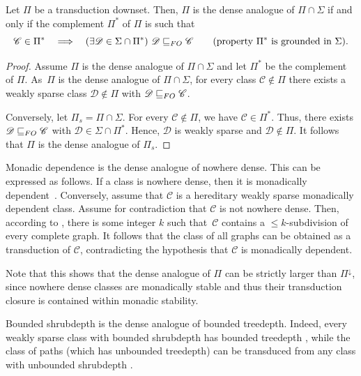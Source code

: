 \documentclass{lmcs}
\newcommand{\Cc}{\mathscr{C}}
\newcommand{\Dd}{\mathscr{D}}
\renewcommand{\FO}{{\rm FO}}
\theoremstyle{definition}
\newcommand{\dset}{downset\xspace}
\begin{document}
\begin{prop}
	Let $\Pi$ be a transduction \dset.
	Then, $\Pi$ is the dense analogue of $\Pi\cap\Sigma$ if and only if 
	the complement $\Pi^*$ of $\Pi$ is such that 
	\[
	\Cc\in\Pi^*\quad\Longrightarrow\quad (\exists \Dd\in\Sigma\cap\Pi^*)\ \Dd\sqsubseteq_\FO\Cc\qquad\text{(\/property $\Pi^*$ is grounded in $\Sigma$)}.
	\]
\end{prop}
\begin{proof}
	Assume $\Pi$ is the dense analogue of $\Pi\cap\Sigma$ and let $\Pi^*$ be the complement of $\Pi$. 
	As~$\Pi$ is the dense analogue of $\Pi\cap\Sigma$, for every class $\Cc\notin\Pi$ there exists a weakly sparse class $\Dd\notin\Pi$ with $\Dd\sqsubseteq_\FO\Cc$. 
	
	Conversely,  let $\Pi_s=\Pi\cap\Sigma$. 
	For every $\Cc\notin\Pi$, we have $\Cc\in\Pi^*$.
	Thus, there exists $\Dd\sqsubseteq_\FO \Cc$ with $\Dd\in\Sigma\cap\Pi^*$. Hence, $\Dd$ is weakly sparse and $\Dd\notin\Pi$. It follows that $\Pi$ is the dense analogue of $\Pi_s$.
\end{proof}

\begin{exa}
	Monadic dependence
	is the dense analogue of nowhere dense.
	This can be expressed as follows.
	If a class is nowhere dense, then it is monadically dependent~\cite{adler2014interpreting}. 
	Conversely, assume that $\mathscr C$ is a hereditary weakly sparse monadically dependent class.  Assume for contradiction that $\mathscr C$ is not nowhere dense. Then, according to  \cite[Theorem 6]{DVORAK2018143}, there is some integer $k$ such that~$\mathscr C$ contains a $\leq k$-subdivision of every complete graph. It follows that the class of all graphs can be obtained as a transduction of $\mathscr C$, contradicting the hypothesis that $\mathscr C$ is 
	monadically dependent.
\end{exa}

Note that this shows that the dense analogue of $\Pi$ can be strictly larger than $\Pi^{\downarrow}$, since nowhere dense classes are monadically stable and thus their transduction closure is contained within monadic stability.


\begin{exa}
	Bounded shrubdepth is the dense analogue of bounded treedepth. Indeed, every weakly sparse class with bounded shrubdepth has bounded treedepth \cite[Proposition~6.4]{Sparsity}, while the class of paths (which has  unbounded treedepth) can be transduced from any class with unbounded shrubdepth \cite[Theorem 1.1]{shrubbery}.
\end{exa}
\end{document}
